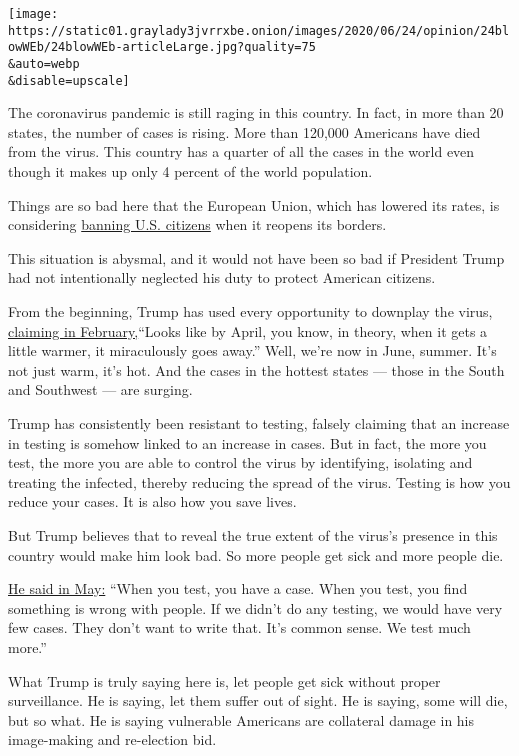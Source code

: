 \texttt{[image: https://static01.graylady3jvrrxbe.onion/images/2020/06/24/opinion/24blowWEb/24blowWEb-articleLarge.jpg?quality=75\\\&auto=webp\\\&disable=upscale]}

The coronavirus pandemic is still raging in this country. In fact, in
more than 20 states, the number of cases is rising. More than 120,000
Americans have died from the virus. This country has a quarter of all
the cases in the world even though it makes up only 4 percent of the
world population.

Things are so bad here that the European Union, which has lowered its
rates, is considering
\href{https://www.nytimes3xbfgragh.onion/2020/06/23/world/europe/coronavirus-EU-American-travel-ban.html}{banning
U.S. citizens} when it reopens its borders.

This situation is abysmal, and it would not have been so bad if
President Trump had not intentionally neglected his duty to protect
American citizens.

From the beginning, Trump has used every opportunity to downplay the
virus,
\href{https://factba.se/transcript/donald-trump-speech-kag-rally-manchester-new-hampshire-february-10-2020}{claiming
in February,}``Looks like by April, you know, in theory, when it gets a
little warmer, it miraculously goes away.'' Well, we're now in June,
summer. It's not just warm, it's hot. And the cases in the hottest
states --- those in the South and Southwest --- are surging.

Trump has consistently been resistant to testing, falsely claiming that
an increase in testing is somehow linked to an increase in cases. But in
fact, the more you test, the more you are able to control the virus by
identifying, isolating and treating the infected, thereby reducing the
spread of the virus. Testing is how you reduce your cases. It is also
how you save lives.

But Trump believes that to reveal the true extent of the virus's
presence in this country would make him look bad. So more people get
sick and more people die.

\href{https://www.marketwatch.com/story/trump-says-coronavirus-testing-overratedclaims-fewer-cases-if-no-testing-2020-05-14}{He
said in May:} ``When you test, you have a case. When you test, you find
something is wrong with people. If we didn't do any testing, we would
have very few cases. They don't want to write that. It's common sense.
We test much more.''

What Trump is truly saying here is, let people get sick without proper
surveillance. He is saying, let them suffer out of sight. He is saying,
some will die, but so what. He is saying vulnerable Americans are
collateral damage in his image-making and re-election bid.


